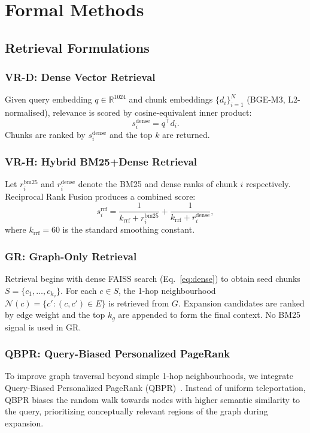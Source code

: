 \documentclass[journal]{IEEEtran}
\begin{document}
\section{Formal Methods}
\label{sec:methods}

\subsection{Retrieval Formulations}

\subsubsection*{VR-D: Dense Vector Retrieval}
Given query embedding $q \in \mathbb{R}^{1024}$ and chunk
embeddings $\{d_i\}_{i=1}^{N}$ (BGE-M3, L2-normalised), relevance
is scored by cosine-equivalent inner product:
\begin{equation}
  s_i^{\mathrm{dense}} = q^\top d_i.
  \label{eq:dense}
\end{equation}
Chunks are ranked by $s_i^{\mathrm{dense}}$ and the top $k$ are
returned.

\subsubsection*{VR-H: Hybrid BM25+Dense Retrieval}
Let $r_i^{\mathrm{bm25}}$ and $r_i^{\mathrm{dense}}$ denote the
BM25 and dense ranks of chunk $i$ respectively.
Reciprocal Rank Fusion produces a combined score:
\begin{equation}
  s_i^{\mathrm{rrf}} = \frac{1}{k_\text{rrf} + r_i^{\mathrm{bm25}}}
                     + \frac{1}{k_\text{rrf} + r_i^{\mathrm{dense}}},
  \label{eq:rrf}
\end{equation}
where $k_\text{rrf} = 60$ is the standard smoothing constant.

\subsubsection*{GR: Graph-Only Retrieval}
Retrieval begins with dense FAISS search (Eq.~\ref{eq:dense})
to obtain seed chunks $S = \{c_1, \ldots, c_{k_v}\}$. For each
$c \in S$, the 1-hop neighbourhood $\mathcal{N}(c) = \{c':(c,c')\in
E\}$ is retrieved from $G$. Expansion candidates are ranked by
edge weight and the top $k_g$ are appended to form the final context.
No BM25 signal is used in GR.

\subsubsection*{QBPR: Query-Biased Personalized PageRank}
To improve graph traversal beyond simple 1-hop neighbourhoods, we integrate
Query-Biased Personalized PageRank (QBPR)~\cite{andersen2006local}. Instead of uniform teleportation, QBPR
biases the random walk towards nodes with higher semantic similarity to the query, 
prioritizing conceptually relevant regions of the graph during expansion.
\end{document}
